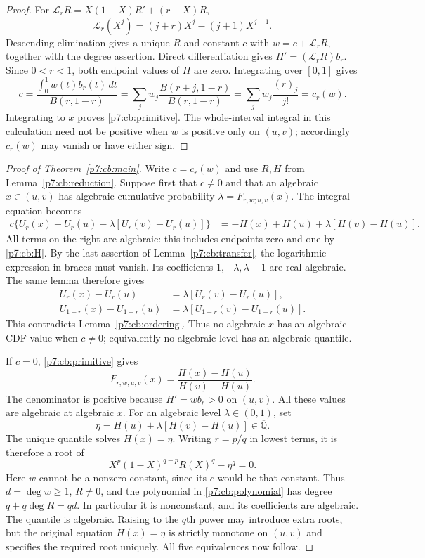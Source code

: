 \documentclass[11pt,a4paper]{article}
\theoremstyle{definition}
\theoremstyle{remark}
\numberwithin{equation}{section}
\begin{document}
\begin{proof}
For $\mathcal L_rR=X(1-X)R'+(r-X)R$,
\[
 \mathcal L_r(X^j)=(j+r)X^j-(j+1)X^{j+1}.
\]
Descending elimination gives a unique $R$ and constant $c$
with $w=c+\mathcal L_rR$, together with the degree assertion.
Direct differentiation gives $H'=(\mathcal L_rR)b_r$.
Since $0<r<1$, both endpoint values of $H$ are zero.
Integrating over $[0,1]$ gives
\[
 c=\frac{\int_0^1w(t)b_r(t)\,dt}{B(r,1-r)}
  =\sum_jw_j\frac{B(r+j,1-r)}{B(r,1-r)}
  =\sum_jw_j\frac{(r)_j}{j!}=c_r(w).
\]
Integrating to $x$ proves \eqref{p7:cb:primitive}.
The whole-interval integral in this calculation need not be
positive when $w$ is positive only on $(u,v)$; accordingly
$c_r(w)$ may vanish or have either sign.
\end{proof}

\begin{proof}[Proof of Theorem~\ref{p7:cb:main}]
Write $c=c_r(w)$ and use $R,H$ from Lemma~\ref{p7:cb:reduction}.
Suppose first that $c\ne0$ and that an algebraic
$x\in(u,v)$ has algebraic cumulative probability
$\lambda=F_{r,w;u,v}(x)$. The integral equation becomes
\begin{align}
 c\{U_r(x)-U_r(u)-\lambda[U_r(v)-U_r(u)]\}
  &=-H(x)+H(u)+\lambda[H(v)-H(u)].
 \label{p7:cb:split}
\end{align}
All terms on the right are algebraic: this includes endpoints
zero and one by \eqref{p7:cb:H}.
By the last assertion of Lemma~\ref{p7:cb:transfer}, the
logarithmic expression in braces must vanish. Its coefficients
$1,-\lambda,\lambda-1$ are real algebraic. The same lemma
therefore gives
\begin{align*}
 U_r(x)-U_r(u)&=\lambda[U_r(v)-U_r(u)],\\
 U_{1-r}(x)-U_{1-r}(u)
    &=\lambda[U_{1-r}(v)-U_{1-r}(u)].
\end{align*}
This contradicts Lemma~\ref{p7:cb:ordering}.
Thus no algebraic $x$ has an algebraic CDF value when $c\ne0$;
equivalently no algebraic level has an algebraic quantile.

If $c=0$, \eqref{p7:cb:primitive} gives
\[
 F_{r,w;u,v}(x)=\frac{H(x)-H(u)}{H(v)-H(u)}.
\]
The denominator is positive because $H'=wb_r>0$ on $(u,v)$.
All these values are algebraic at algebraic $x$.
For an algebraic level $\lambda\in(0,1)$, set
\[
 \eta=H(u)+\lambda[H(v)-H(u)]\in\overline{\mathbb Q}.
\]
The unique quantile solves $H(x)=\eta$.
Writing $r=p/q$ in lowest terms, it is therefore a root of
\begin{equation}\label{p7:cb:polynomial}
 X^p(1-X)^{q-p}R(X)^q-\eta^q=0.
\end{equation}
Here $w$ cannot be a nonzero constant, since its $c$ would
be that constant. Thus $d=\deg w\ge1$, $R\ne0$, and the
polynomial in \eqref{p7:cb:polynomial} has degree
$q+q\deg R=qd$. In particular it is nonconstant, and its
coefficients are algebraic. The quantile is algebraic.
Raising to the $q$th power may introduce extra roots, but the
original equation $H(x)=\eta$ is strictly monotone on $(u,v)$
and specifies the required root uniquely.
All five equivalences now follow.
\end{proof}
\end{document}
